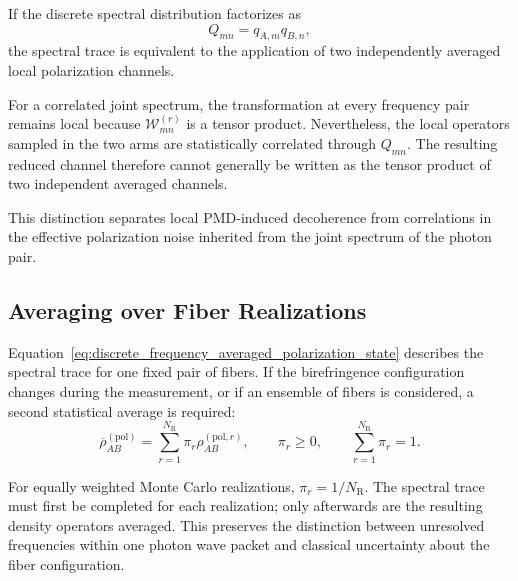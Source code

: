 If the discrete spectral distribution factorizes as
%
\begin{equation}
    Q_{mn}
    =
    q_{A,m}q_{B,n},
    \label{eq:factorized_discrete_joint_weights}
\end{equation}
%
the spectral trace is equivalent to the application of two independently
averaged local polarization channels.

For a correlated joint spectrum, the transformation at every frequency pair
remains local because
\(\mathcal{W}_{mn}^{(r)}\) is a tensor product. Nevertheless, the local
operators sampled in the two arms are statistically correlated through
\(Q_{mn}\). The resulting reduced channel therefore cannot generally be
written as the tensor product of two independent averaged channels.

This distinction separates local PMD-induced decoherence from correlations
in the effective polarization noise inherited from the joint spectrum of
the photon pair.


\subsection{Averaging over Fiber Realizations}
\label{subsec:numerical_fiber_realization_averaging}

Equation~\eqref{eq:discrete_frequency_averaged_polarization_state}
describes the spectral trace for one fixed pair of fibers. If the
birefringence configuration changes during the measurement, or if an
ensemble of fibers is considered, a second statistical average is required:
%
\begin{equation}
    \overline{\rho}_{AB}^{(\mathrm{pol})}
    =
    \sum_{r=1}^{N_{\mathrm{R}}}
    \pi_r
    \rho_{AB}^{(\mathrm{pol},r)},
    \qquad
    \pi_r\geq0,
    \qquad
    \sum_{r=1}^{N_{\mathrm{R}}}\pi_r=1.
    \label{eq:numerical_fiber_realization_average}
\end{equation}

For equally weighted Monte Carlo realizations,
\(\pi_r=1/N_{\mathrm{R}}\). The spectral trace must first be completed for
each realization; only afterwards are the resulting density operators
averaged. This preserves the distinction between unresolved frequencies
within one photon wave packet and classical uncertainty about the fiber
configuration.

